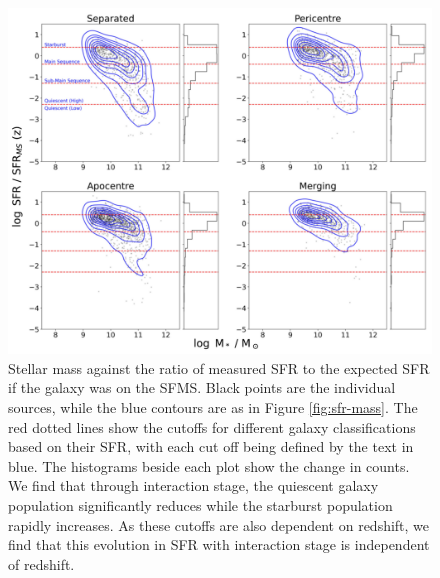 \begin{figure}
\centering
\includegraphics[width=\textwidth]{Chapter3/figures/sfr-clsf-dist.pdf}
\caption[Stellar mass against the ratio of measured SFR to the expected SFR if the galaxy was on the SFMS.]{Stellar mass against the ratio of measured SFR to the expected SFR if the galaxy was on the SFMS. Black points are the individual sources, while the blue contours are as in Figure \ref{fig:sfr-mass}. The red dotted lines show the cutoffs for different galaxy classifications based on their SFR, with each cut off being defined by the text in blue. The histograms beside each plot show the change in counts. We find that through interaction stage, the quiescent galaxy population significantly reduces while the starburst population rapidly increases. As these cutoffs are also dependent on redshift, we find that this evolution in SFR with interaction stage is independent of redshift.}
\label{fig:sfr-clsf}
\end{figure}

